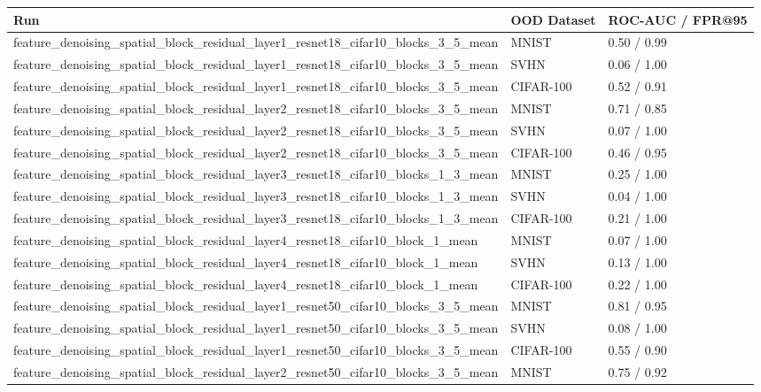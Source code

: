 \begin{tabular}{lll}
\toprule
Run & OOD Dataset & ROC-AUC / FPR@95 \\
\midrule
feature\_denoising\_spatial\_block\_residual\_layer1\_resnet18\_cifar10\_blocks\_3\_5\_mean & MNIST & 0.50 / 0.99 \\
feature\_denoising\_spatial\_block\_residual\_layer1\_resnet18\_cifar10\_blocks\_3\_5\_mean & SVHN & 0.06 / 1.00 \\
feature\_denoising\_spatial\_block\_residual\_layer1\_resnet18\_cifar10\_blocks\_3\_5\_mean & CIFAR-100 & 0.52 / 0.91 \\
feature\_denoising\_spatial\_block\_residual\_layer2\_resnet18\_cifar10\_blocks\_3\_5\_mean & MNIST & 0.71 / 0.85 \\
feature\_denoising\_spatial\_block\_residual\_layer2\_resnet18\_cifar10\_blocks\_3\_5\_mean & SVHN & 0.07 / 1.00 \\
feature\_denoising\_spatial\_block\_residual\_layer2\_resnet18\_cifar10\_blocks\_3\_5\_mean & CIFAR-100 & 0.46 / 0.95 \\
feature\_denoising\_spatial\_block\_residual\_layer3\_resnet18\_cifar10\_blocks\_1\_3\_mean & MNIST & 0.25 / 1.00 \\
feature\_denoising\_spatial\_block\_residual\_layer3\_resnet18\_cifar10\_blocks\_1\_3\_mean & SVHN & 0.04 / 1.00 \\
feature\_denoising\_spatial\_block\_residual\_layer3\_resnet18\_cifar10\_blocks\_1\_3\_mean & CIFAR-100 & 0.21 / 1.00 \\
feature\_denoising\_spatial\_block\_residual\_layer4\_resnet18\_cifar10\_block\_1\_mean & MNIST & 0.07 / 1.00 \\
feature\_denoising\_spatial\_block\_residual\_layer4\_resnet18\_cifar10\_block\_1\_mean & SVHN & 0.13 / 1.00 \\
feature\_denoising\_spatial\_block\_residual\_layer4\_resnet18\_cifar10\_block\_1\_mean & CIFAR-100 & 0.22 / 1.00 \\
feature\_denoising\_spatial\_block\_residual\_layer1\_resnet50\_cifar10\_blocks\_3\_5\_mean & MNIST & 0.81 / 0.95 \\
feature\_denoising\_spatial\_block\_residual\_layer1\_resnet50\_cifar10\_blocks\_3\_5\_mean & SVHN & 0.08 / 1.00 \\
feature\_denoising\_spatial\_block\_residual\_layer1\_resnet50\_cifar10\_blocks\_3\_5\_mean & CIFAR-100 & 0.55 / 0.90 \\
feature\_denoising\_spatial\_block\_residual\_layer2\_resnet50\_cifar10\_blocks\_3\_5\_mean & MNIST & 0.75 / 0.92 \\

\end{tabular}
